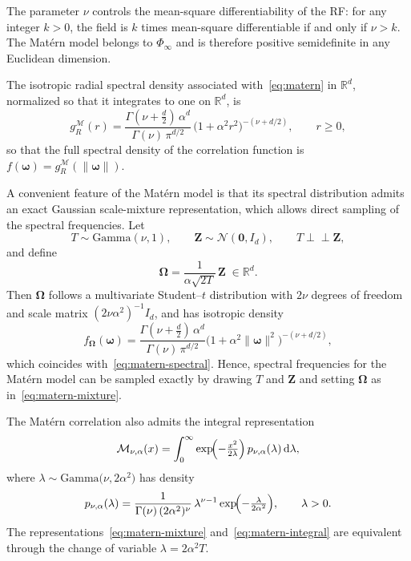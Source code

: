 \documentclass[
  12pt]{article}
\begin{document}
The parameter $\nu$ controls the mean-square differentiability of the RF: for any integer $k>0$, the field is $k$ times mean-square differentiable if and only if $\nu>k$.
The Mat\'ern model belongs to $\Phi_{\infty}$ and is therefore positive semidefinite in any Euclidean dimension.

The isotropic radial spectral density associated with~\eqref{eq:matern} in $\mathbb{R}^d$, normalized so that it integrates to one on $\mathbb{R}^d$, is
\begin{equation}\label{eq:matern-spectral}
g_{R}^{\mathcal{M}}(r)
= \frac{\Gamma(\nu+\tfrac{d}{2})\,\alpha^{d}}{\Gamma(\nu)\,\pi^{d/2}}\,
\bigl(1+\alpha^{2} r^{2}\bigr)^{-(\nu+d/2)},
\qquad r \ge 0,
\end{equation}
so that the full spectral density of the correlation function is
$
f(\boldsymbol{\omega}) = g_{R}^{\mathcal{M}}(\|\boldsymbol{\omega}\|).
$

A convenient feature of the Mat\'ern model is that its spectral distribution admits an exact Gaussian scale-mixture representation, which allows direct sampling of the spectral frequencies.
Let
\[
T \sim \mathrm{Gamma}(\nu,1),
\qquad
\mathbf{Z} \sim \mathcal{N}(\mathbf{0},I_d),
\qquad
T \perp\!\!\!\perp \mathbf{Z},
\]
and define
\begin{equation}\label{eq:matern-mixture}
\boldsymbol{\Omega} = \frac{1}{\alpha\sqrt{2T}}\,\mathbf{Z}
\;\in\mathbb{R}^d.
\end{equation}
Then $\boldsymbol{\Omega}$ follows a multivariate Student--$t$ distribution \citep{fang1990symmetric} with $2\nu$ degrees of freedom and scale matrix $(2\nu\alpha^{2})^{-1}I_d$, and has isotropic density
\[
f_{\boldsymbol{\Omega}}(\boldsymbol{\omega})
=
\frac{\Gamma(\nu+\tfrac{d}{2})\,\alpha^{d}}{\Gamma(\nu)\,\pi^{d/2}}
\bigl(1+\alpha^{2}\|\boldsymbol{\omega}\|^{2}\bigr)^{-(\nu+d/2)},
\]
which coincides with~\eqref{eq:matern-spectral}.
Hence, spectral frequencies for the Mat\'ern model can be sampled exactly by drawing $T$ and $\mathbf{Z}$ and setting $\boldsymbol{\Omega}$ as in~\eqref{eq:matern-mixture}.

The Mat\'ern correlation also admits the integral representation
\begin{equation}\label{eq:matern-integral}
\mathcal{M}_{\nu,\alpha}(x)
=
\int_{0}^{\infty}
\exp\!\Bigl(-\tfrac{x^{2}}{2\lambda}\Bigr)\,
p_{\nu,\alpha}(\lambda)\,{\rm d}\lambda,
\end{equation}
where $\lambda \sim \mathrm{Gamma}\!\bigl(\nu,2\alpha^{2}\bigr)$ has density
\[
p_{\nu,\alpha}(\lambda)
= \frac{1}{\Gamma(\nu)\,(2\alpha^{2})^{\nu}}\,
\lambda^{\nu-1}\exp\!\Bigl(-\tfrac{\lambda}{2\alpha^{2}}\Bigr),
\qquad \lambda>0.
\]
The representations~\eqref{eq:matern-mixture} and~\eqref{eq:matern-integral} are equivalent through the change of variable $\lambda=2\alpha^{2}T$.
\end{document}
